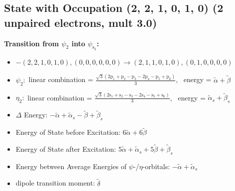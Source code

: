 \documentclass[12pt,a4paper]{article}
\begin{document}
\subsection*{State with Occupation (2, 2, 1, 0, 1, 0) (2 unpaired electrons, mult 3.0)}
        \noindent\textbf{Transition from $\psi_{2}$ into $\psi_{\text{s}_{2}}$:}
        \begin{itemize}
            \item $- (2, 2, 1, 0, 1, 0), (0, 0, 0, 0, 0, 0) \rightarrow (2, 1, 1, 0, 1, 0), (0, 1, 0, 0, 0, 0)$
        
            \item $\psi_{2}:$ linear combination = $\frac{\sqrt{3} \left(2 \text{p}_{1} + \text{p}_{2} - \text{p}_{3} - 2 \text{p}_{4} - \text{p}_{5} + \text{p}_{6}\right)}{3}$, \
            energy = $\tilde{\alpha} + \tilde{\beta}$
            
            \item $\eta_{2}:$ linear combination = $\frac{\sqrt{3} \left(2 \text{s}_{1} + \text{s}_{2} - \text{s}_{3} - 2 \text{s}_{4} - \text{s}_{5} + \text{s}_{6}\right)}{3}$, \
            energy = $\tilde{\alpha}_{s} + \tilde{\beta}_{s}$
            
                \item $\Delta$ Energy: $- \tilde{\alpha} + \tilde{\alpha}_{s} - \tilde{\beta} + \tilde{\beta}_{s}$
                \item Energy of State before Excitation: $6 \tilde{\alpha} + 6 \tilde{\beta}$
                \item Energy of State after Excitation: $5 \tilde{\alpha} + \tilde{\alpha}_{s} + 5 \tilde{\beta} + \tilde{\beta}_{s}$
                \item Energy between Average Energies of $\psi$-/$\eta$-orbitals: $- \tilde{\alpha} + \tilde{\alpha}_{s}$
            
            \item dipole transition moment: $\tilde{\delta}$
        
        \end{itemize}
        
\end{document}
